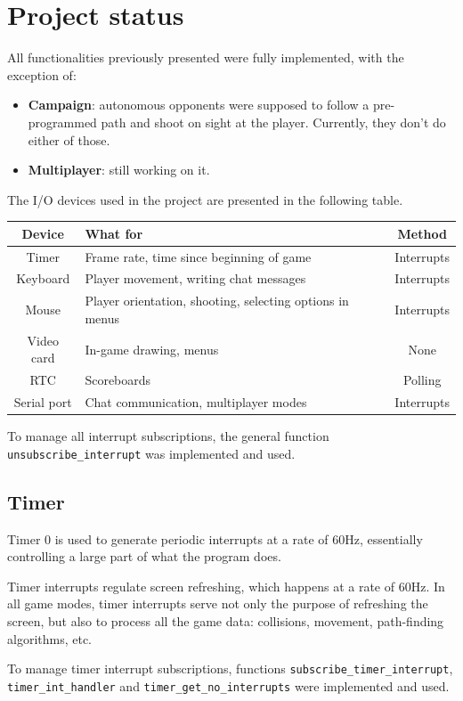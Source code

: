 \documentclass{article}
\theoremstyle{remark}
\begin{document}
\section{Project status}
All functionalities previously presented were fully implemented, with the exception of:
\begin{itemize}
	\item \textbf{Campaign}: autonomous opponents were supposed to follow a pre-programmed path and shoot on sight at the player. Currently, they don't do either of those.
	\item \textbf{Multiplayer}: still working on it.
\end{itemize}
The I/O devices used in the project are presented in the following table.
\begin{center} \begin{tabular}{c || l | c}
	\textbf{Device} & \textbf{What for}                                        & Method \\ \hline
	Timer           & Frame rate, time since beginning of game                 & Interrupts \\
	Keyboard        & Player movement, writing chat messages                   & Interrupts \\
	Mouse           & Player orientation, shooting, selecting options in menus & Interrupts \\
	Video card      & In-game drawing, menus                                   & None \\
	RTC             & Scoreboards                                              & Polling \\
	Serial port     & Chat communication, multiplayer modes                    & Interrupts
\end{tabular} \end{center}
To manage all interrupt subscriptions, the general function \texttt{unsubscribe\_interrupt} was implemented and used.
\subsection{Timer}
Timer 0 is used to generate periodic interrupts at a rate of 60Hz, essentially controlling a large part of what the program does.\par
Timer interrupts regulate screen refreshing, which happens at a rate of 60Hz. In all game modes, timer interrupts serve not only the purpose of refreshing the screen, but also to process all the game data: collisions, movement, path-finding algorithms, etc. \par
To manage timer interrupt subscriptions, functions \texttt{subscribe\_timer\_interrupt}, \texttt{timer\_int\_handler} and \texttt{timer\_get\_no\_interrupts} were implemented and used.
\end{document}
